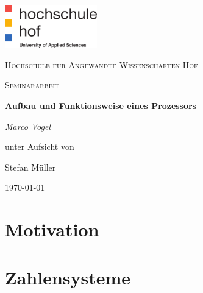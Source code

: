 \documentclass[12pt]{article}
\begin{document}
\begin{titlepage}
	\centering
	\includegraphics[width=0.3\textwidth]{logo}\par\vspace{1cm}
	{\scshape\LARGE Hochschule für Angewandte Wissenschaften Hof \par}
	\vspace{1cm}
	{\scshape\Large Seminararbeit\par}
	\vspace{1.5cm}
	{\huge\bfseries Aufbau und Funktionsweise eines Prozessors\par}
	\vspace{2cm}
	{\Large\itshape Marco Vogel\par}
	\vfill
	unter Aufsicht von\par
	Stefan Müller
	\vfill
	{\large\today\par}
\end{titlepage}
\newpage

\pagestyle{empty} 
\tableofcontents
\newpage
\pagestyle{fancy}
\fancyhf{}
\fancyhead[L]{\rightmark}
\fancyhead[R]{\thepage}
\renewcommand{\headrulewidth}{1pt}
\setlength{\footnotemargin}{0pt}

\setcounter{page}{1}

\section{Motivation}


\section{Zahlensysteme}
\end{document}
